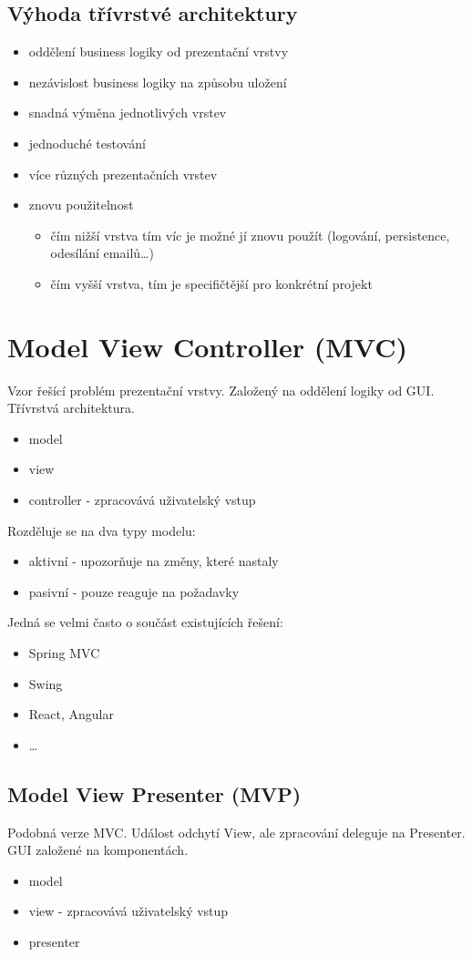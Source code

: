 \documentclass{szzclass}
\begin{document}
\subsection{Výhoda třívrstvé architektury}
\begin{itemize}
    \item oddělení business logiky od prezentační vrstvy
    \item nezávislost business logiky na způsobu uložení
    \item snadná výměna jednotlivých vrstev
    \item jednoduché testování
    \item více různých prezentačních vrstev
    \item znovu použitelnost
    \begin{itemize}
        \item čím nižší vrstva tím víc je možné jí znovu použít (logování, persistence, odesílání emailů\dots)
        \item čím vyšší vrstva, tím je specifičtější pro konkrétní projekt
    \end{itemize}
\end{itemize}
\section{Model View Controller (MVC)}
Vzor řešící problém prezentační vrstvy. Založený na oddělení logiky od GUI. Třívrstvá architektura.
\begin{itemize}
    \item model
    \item view
    \item controller - zpracovává uživatelský vstup
\end{itemize}
Rozděluje se na dva typy modelu:
\begin{itemize}
    \item aktivní - upozorňuje na změny, které nastaly
    \item pasivní - pouze reaguje na požadavky
\end{itemize}
Jedná se velmi často o součást existujících řešení:
\begin{itemize}
    \item Spring MVC
    \item Swing
    \item React, Angular
    \item \dots
\end{itemize}
\subsection{Model View Presenter (MVP)}
Podobná verze MVC. Událost odchytí View, ale zpracování deleguje na Presenter. GUI založené na komponentách.
\begin{itemize}
    \item model
    \item view - zpracovává uživatelský vstup
    \item presenter
\end{itemize}
\end{document}
